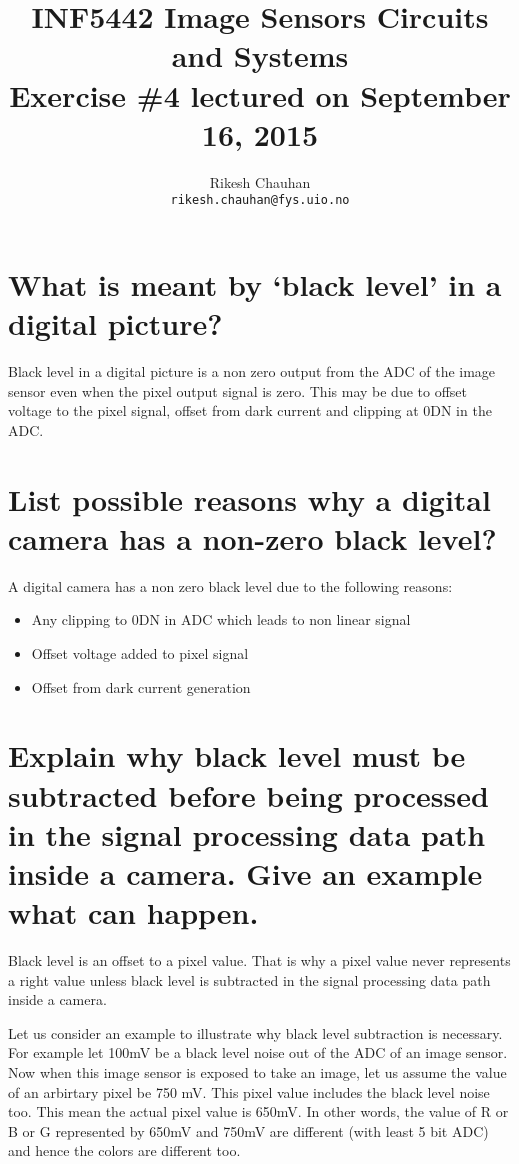 \documentclass{article}
\title{INF5442 Image Sensors Circuits and Systems\\
Exercise \#4 lectured on September 16, 2015}
\author{Rikesh Chauhan\\ 
\texttt{rikesh.chauhan@fys.uio.no}}
\date{}
\begin{document}
\maketitle

\section{What is meant by ‘black level’ in a digital picture?}
Black level in a digital picture is a non zero output from the ADC of the image 
sensor even when the pixel output signal is zero. This may be due to offset 
voltage to the pixel signal, offset from dark current and clipping at 0DN in 
the ADC.

\section{List possible reasons why a digital camera has a non-zero 
black level?}
A digital camera has a non zero black level due to the following reasons:
\begin{itemize}
\item Any clipping to 0DN in ADC which leads to non linear signal
\item Offset voltage added to pixel signal
\item Offset from dark current generation
\end{itemize}

\section{Explain why black level must be subtracted before being 
processed in the signal processing data path inside a camera. 
Give an example what can happen.}
Black level is an offset to a pixel value. That is why a pixel value never 
represents a right value unless black level is subtracted in the signal processing 
data path inside a camera.\newline

\noindent Let us consider an example to illustrate why black level subtraction is 
necessary. For example let 100mV be a black level noise out of the ADC of an image 
sensor. Now when this image sensor is exposed to take an image, let us assume the 
value of an arbirtary pixel be 750 mV. This pixel value includes the black level 
noise too. This mean the actual pixel value is 650mV. In other words, the value of 
R or B or G represented by 650mV and 750mV are different (with least 5 bit ADC) and 
hence the colors are different too. \\
\end{document}

